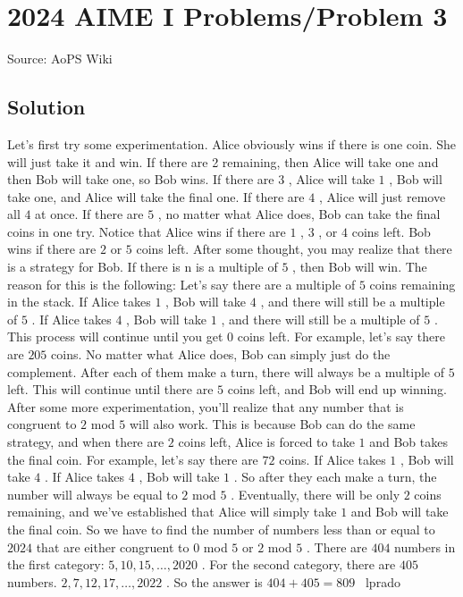 \documentclass[12pt]{article}
\begin{document}
\section*{{2024 AIME I Problems/Problem 3}}
Source: AoPS Wiki

\subsection*{Solution}
Let's first try some experimentation. Alice obviously wins if there is one coin. She will just take it and win. If there are 2 remaining, then Alice will take one and then Bob will take one, so Bob wins. If there are $3$ , Alice will take $1$ , Bob will take one, and Alice will take the final one. If there are $4$ , Alice will just remove all $4$ at once. If there are $5$ , no matter what Alice does, Bob can take the final coins in one try. Notice that Alice wins if there are $1$ , $3$ , or $4$ coins left. Bob wins if there are $2$ or $5$ coins left. After some thought, you may realize that there is a strategy for Bob. If there is n is a multiple of $5$ , then Bob will win. The reason for this is the following: Let's say there are a multiple of $5$ coins remaining in the stack. If Alice takes $1$ , Bob will take $4$ , and there will still be a multiple of $5$ . If Alice takes $4$ , Bob will take $1$ , and there will still be a multiple of $5$ . This process will continue until you get $0$ coins left. For example, let's say there are $205$ coins. No matter what Alice does, Bob can simply just do the complement. After each of them make a turn, there will always be a multiple of $5$ left. This will continue until there are $5$ coins left, and Bob will end up winning. After some more experimentation, you'll realize that any number that is congruent to $2$ mod $5$ will also work. This is because Bob can do the same strategy, and when there are $2$ coins left, Alice is forced to take $1$ and Bob takes the final coin. For example, let's say there are $72$ coins. If Alice takes $1$ , Bob will take $4$ . If Alice takes $4$ , Bob will take $1$ . So after they each make a turn, the number will always be equal to $2$ mod $5$ . Eventually, there will be only $2$ coins remaining, and we've established that Alice will simply take $1$ and Bob will take the final coin. So we have to find the number of numbers less than or equal to $2024$ that are either congruent to $0$ mod $5$ or $2$ mod $5$ . There are $404$ numbers in the first category: $5, 10, 15, \dots, 2020$ . For the second category, there are $405$ numbers. $2, 7, 12, 17, \dots, 2022$ . So the answer is $404 + 405 = \boxed{809}$ ~lprado
\end{document}
